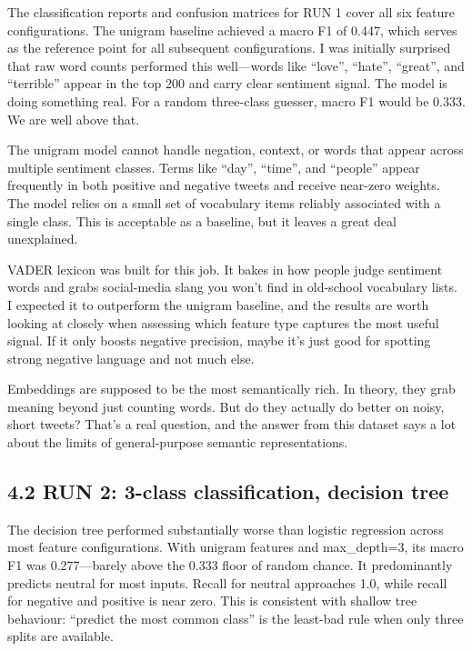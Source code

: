 \documentclass[12pt]{article}
\begin{document}
The classification reports and confusion matrices for RUN 1 cover all six feature configurations. The unigram baseline achieved a macro F1 of 0.447, which serves as the reference point for all subsequent configurations. I was initially surprised that raw word counts performed this well---words like ``love'', ``hate'', ``great'', and ``terrible'' appear in the top 200 and carry clear sentiment signal. The model is doing something real. For a random three-class guesser, macro F1 would be 0.333. We are well above that.

The unigram model cannot handle negation, context, or words that appear across multiple sentiment classes. Terms like ``day'', ``time'', and ``people'' appear frequently in both positive and negative tweets and receive near-zero weights. The model relies on a small set of vocabulary items reliably associated with a single class. This is acceptable as a baseline, but it leaves a great deal unexplained.

VADER lexicon was built for this job. It bakes in how people judge sentiment words and grabs social-media slang you won't find in old-school vocabulary lists. I expected it to outperform the unigram baseline, and the results are worth looking at closely when assessing which feature type captures the most useful signal. If it only boosts negative precision, maybe it's just good for spotting strong negative language and not much else.

Embeddings are supposed to be the most semantically rich. In theory, they grab meaning beyond just counting words. But do they actually do better on noisy, short tweets? That's a real question, and the answer from this dataset says a lot about the limits of general-purpose semantic representations.



\subsection*{4.2 RUN 2: 3-class classification, decision tree}



The decision tree performed substantially worse than logistic regression across most feature configurations. With unigram features and max\_depth=3, its macro F1 was 0.277---barely above the 0.333 floor of random chance. It predominantly predicts neutral for most inputs. Recall for neutral approaches 1.0, while recall for negative and positive is near zero. This is consistent with shallow tree behaviour: ``predict the most common class'' is the least-bad rule when only three splits are available.
\end{document}
